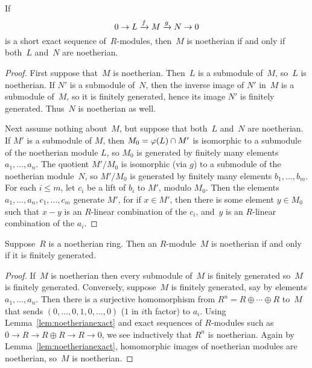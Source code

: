 \begin{lemma}\label{lem:noetherianexact}
If 
$$
 0 \to L \xrightarrow{f} M \xrightarrow{g} N \to 0
$$ 
is a short exact sequence of~$R$-modules, then~$M$ is noetherian if and 
only if both~$L$ and~$N$ are noetherian.
\end{lemma}
\begin{proof}
First suppose that~$M$ is noetherian.  Then~$L$ is a submodule of~$M$, so~$L$
is noetherian.   If $N'$ is a submodule of~$N$, then the inverse image of $N'$
in~$M$ is a submodule of~$M$, so it is finitely generated, hence its image
$N'$ is finitely generated.  Thus~$N$ is noetherian as well.

Next assume nothing about~$M$, but suppose that both~$L$ and~$N$ are
noetherian.  If $M'$ is a submodule of $M$, then $M_0=\varphi(L)\cap M'$
is isomorphic to a submodule of the noetherian module $L$, so $M_0$ is
generated by finitely many elements $a_1,\ldots, a_n$.  The quotient
$M'/M_0$ is isomorphic (via $g$) to a submodule of the noetherian
module~$N$, so $M'/M_0$ is generated by finitely many elements
$b_1,\ldots, b_m$. For each $i\leq m$, let $c_i$ be a lift of $b_i$ to
$M'$, modulo $M_0$.  Then the elements $a_1,\ldots, a_n, c_1,\ldots,
c_m$ generate $M'$, for if $x\in M'$, then there is some element $y\in
M_0$ such that $x-y$ is an $R$-linear combination of the $c_i$,
and~$y$ is an $R$-linear combination of the $a_i$.
\end{proof}


\begin{proposition}\label{prop:noethfg}
Suppose~$R$ is a noetherian ring.  Then an $R$-module~$M$ is 
noetherian if and only if it is finitely generated. 
\end{proposition}
\begin{proof}
If~$M$ is noetherian then every submodule of~$M$ is finitely generated
so~$M$ is finitely generated.  Conversely, suppose~$M$ is finitely
generated, say by elements $a_1,\ldots, a_n$.  Then there is a
surjective homomorphism from $R^n=R\oplus \cdots \oplus R$ to~$M$ that
sends $(0,\ldots,0,1,0,\ldots,0)$ ($1$ in $i$th factor) to $a_i$.
Using Lemma~\ref{lem:noetherianexact} and exact sequences of
$R$-modules such as $0\to R\to R\oplus R\to R\to 0$, we see
inductively that $R^n$ is noetherian.  Again by
Lemma~\ref{lem:noetherianexact}, homomorphic images of noetherian
modules are noetherian, so~$M$ is noetherian.
\end{proof}

